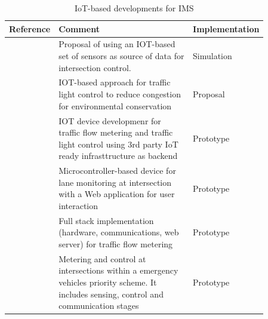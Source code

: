 \documentclass[conference]{IEEEtran}
\begin{document}
\begin{table}[tp]
\caption{IoT-based developments for IMS}
\label{iotrev}
\begin{xtabular}{|p{0.12\linewidth}|p{0.52\linewidth}|p{0.22\linewidth}|}

\hline
\textbf{Reference} & \textbf{Comment} & \textbf{Implementation} \\
\hline

{\cite{Tan2011}} &
{Proposal of using an IOT-based set of sensors as source of data for intersection control.\vfill} &
{Simulation}\\

\hline
{\cite{Turcu2012}} &
{IOT-based approach for traffic light control to reduce congestion for environmental conservation } &
{Proposal} \\

\hline
{\cite{Chong2016}} & { IOT device developmenr for traffic flow metering and traffic light control using 3rd party IoT ready infrasttructure as backend} & {Prototype} \\

\hline
{\cite{Talukder2017}} & {Microcontroller-based device for lane monitoring at intersection with a Web application for user interaction} & {Prototype} \\

\hline
\cite{Nagmode2018} & {Full stack implementation (hardware, communications, web server) for traffic flow metering} & {Prototype} \\

\hline
{\cite{Khan2018}} & { Metering and control at intersections within a emergency vehicles priority scheme. It includes sensing, control and communication stages} & {Prototype} \\

\hline

\end{xtabular}
\end{table}










\end{document}
